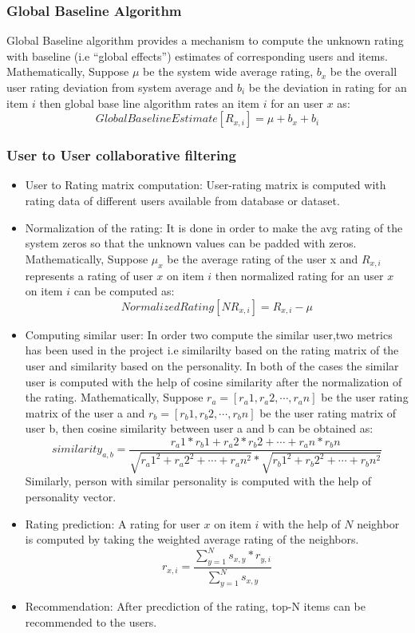 \subsubsection{Global Baseline Algorithm}
Global Baseline algorithm provides a mechanism to compute the unknown rating with baseline (i.e ``global effects'') estimates of corresponding users and items.
Mathematically,
Suppose $\mu$ be the system wide average rating, $b_x$ be the overall user rating deviation from system average and $b_i$ be the deviation in rating for an item $i$ then global base line algorithm rates an item $i$ for an user $x$ as:
\begin{equation}\label{eq:baseline}
	Global Baseline Estimate[R_{x,i}] = \mu + b_x + b_i
\end{equation}
\subsubsection{User to User collaborative filtering}
\begin{itemize}
	\item User to Rating matrix computation: User-rating matrix is computed with rating data of different users available from database or dataset.
	\item Normalization of the rating: It is done in order to make the avg rating of the system zeros so that the unknown values can be padded with zeros.
Mathematically,
Suppose $\mu_x$ be the average rating of the user x and $R_{x,i}$ represents a rating of user $x$ on item $i$ then normalized rating for an user $x$ on item $i$ can be computed as:
\begin{equation}\label{eq:normal}
	Normalized Rating[NR_{x,i}] = R_{x,i} - \mu
\end{equation}
\item Computing similar user: In order two compute the similar user,two metrics has been used in the project i.e similarilty based on the rating matrix of the user and similarity based on the personality. In both of the cases the similar user is computed with the help of cosine similarity after the normalization of the rating.
Mathematically,
Suppose $r_a = [r_a1,r_a2,\cdots,r_an]$ be the user rating matrix of the user a and  $r_b = [r_b1,r_b2,\cdots,r_bn]$ be the user rating matrix of user b, then cosine similarity between user a and b can be obtained as:
\begin{equation}
	similarity_{a,b} = \frac{r_a1*r_b1 + r_a2*r_b2 +\cdots+ r_an*r_bn}{\sqrt{{r_a1}^2+{r_a2}^2+\cdots+{r_an}^2} * \sqrt{{r_b1}^2+{r_b2}^2+\cdots+{r_bn}^2} }
\end{equation}
Similarly, person with similar personality is computed with the help of personality vector.
\item Rating prediction: A rating for user $x$ on item $i$ with the help of $N$ neighbor is computed by taking the weighted average rating of the neighbors.
\begin{equation}\label{eq:cf}
	r_{x,i} = \frac{\sum_{y=1}^N s_{x,y}*r_{y,i}}{\sum_{y=1}^N s_{x,y}}
\end{equation}
\item Recommendation: After precdiction of the rating, top-N items can be recommended to the users.
\end{itemize}
